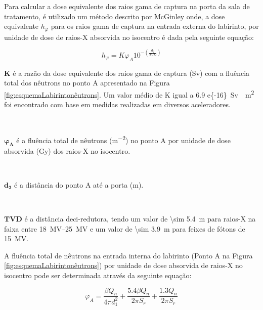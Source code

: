 \documentclass[11pt,a4paper]{article}
\newcounter{exemplo}
\begin{document}
        Para calcular a dose equivalente dos raios gama de captura na porta da sala de tratamento, é utilizado um método descrito por McGinley onde, a dose equivalente $h_{\varphi}$ para os raios gama de captura na entrada externa do labirinto, por unidade de dose de raios-X absorvida no isocentro é dada pela seguinte equação:

            \begin{equation}
                h_{\varphi} = K \varphi_A 10^{-\left(\frac{d_2}{TVD}\right)}
            \end{equation}


        \begin{exemplo}[onde:]
                \textcolor{CarnationPink}{$\mathbf{K}$} é a razão da dose equivalente dos raios gama de captura (Sv) com a fluência total dos nêutrons no ponto A apresentado na Figura \ref{fig:esquemaLabirintonêutrons}. Um valor médio de K igual a \qty{6.9 e{-16}}{Sv \cdot m^2} foi encontrado com base em medidas realizadas em diversos aceleradores.

                \

                \textcolor{CarnationPink}{$\mathbf{\varphi_A}$} é a fluência total de nêutrons (\unit{m^{-2}}) no ponto A por unidade de dose absorvida (\unit{Gy}) dos raios-X no isocentro.

                \

                \textcolor{CarnationPink}{$\mathbf{d_2}$} é a distância do ponto A até a porta (m).

                \

                \textcolor{CarnationPink}{$\mathbf{TVD}$} é a distância deci-redutora, tendo um valor de \qty{\sim 5.4}{m} para raios-X na faixa entre \qtyrange{18}{25}{MV} e um valor de \qty{\sim 3.9}{m} para feixes de fótons de \qty{15}{MV}.
        \end{exemplo}

        A fluência total de nêutrons na entrada interna do labirinto (Ponto A na Figura \ref{fig:esquemaLabirintonêutrons}) por unidade de dose absorvida de raios-X no isocentro pode ser determinada através da seguinte equação:

            \begin{equation}
                \varphi_A = \frac{\beta Q_n}{4 \pi d_1^2} 
                + \frac{5.4 \beta Q_n}{2 \pi S_r} 
                + \frac{1.3 Q_n}{2 \pi S_r}
            \end{equation}
\end{document}
